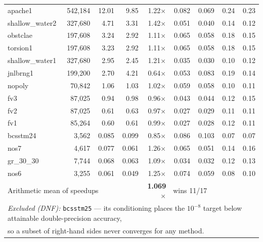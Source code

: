 \documentclass{article}
\newcommand{\1}{\mathbbm{1}}
\theoremstyle{plain}
\begin{document}
\begin{table}[!t]
\begin{tabular}{l r rr r rr rr}
apache1          &   542{,}184 &  12.01 &   9.85 & 1.22$\times$ & 0.082 & 0.069 & 0.24 & 0.23 \\

shallow\_water2  &   327{,}680 &   4.71 &   3.31 & 1.42$\times$ & 0.051 & 0.040 & 0.14 & 0.12 \\

obstclae         &   197{,}608 &   3.24 &   2.92 & 1.11$\times$ & 0.065 & 0.058 & 0.18 & 0.15 \\

torsion1         &   197{,}608 &   3.23 &   2.92 & 1.11$\times$ & 0.065 & 0.058 & 0.18 & 0.15 \\

shallow\_water1  &   327{,}680 &   2.95 &   2.45 & 1.21$\times$ & 0.035 & 0.030 & 0.10 & 0.12 \\

jnlbrng1         &   199{,}200 &   2.70 &   4.21 & 0.64$\times$ & 0.053 & 0.083 & 0.19 & 0.14 \\

nopoly           &    70{,}842 &   1.06 &   1.03 & 1.02$\times$ & 0.059 & 0.058 & 0.10 & 0.11 \\

fv3              &    87{,}025 &   0.94 &   0.98 & 0.96$\times$ & 0.043 & 0.044 & 0.12 & 0.15 \\

fv2              &    87{,}025 &   0.61 &   0.63 & 0.97$\times$ & 0.027 & 0.029 & 0.11 & 0.11 \\

fv1              &    85{,}264 &   0.60 &   0.61 & 0.99$\times$ & 0.027 & 0.028 & 0.12 & 0.11 \\

bcsstm24         &     3{,}562 &   0.085 &  0.099 & 0.85$\times$ & 0.086 & 0.103 & 0.07 & 0.07 \\

nos7             &     4{,}617 &   0.077 &  0.061 & 1.26$\times$ & 0.065 & 0.051 & 0.14 & 0.16 \\

gr\_30\_30       &     7{,}744 &   0.068 &  0.063 & 1.09$\times$ & 0.034 & 0.032 & 0.12 & 0.13 \\

nos6             &     3{,}255 &   0.061 &  0.049 & 1.25$\times$ & 0.074 & 0.059 & 0.08 & 0.10 \\

\midrule

\multicolumn{4}{l}{Arithmetic mean of speedups}

& \textbf{1.069$\times$} & \multicolumn{4}{l}{wins 11/17} \\

\multicolumn{9}{l}{\emph{Excluded (DNF):} \texttt{bcsstm25} --- its conditioning places the $10^{-8}$ target below attainable double-precision accuracy,} \\
\multicolumn{9}{l}{ so a subset of right-hand sides never converges for any method.} \\
\bottomrule

\end{tabular}

\end{table}
\end{document}
